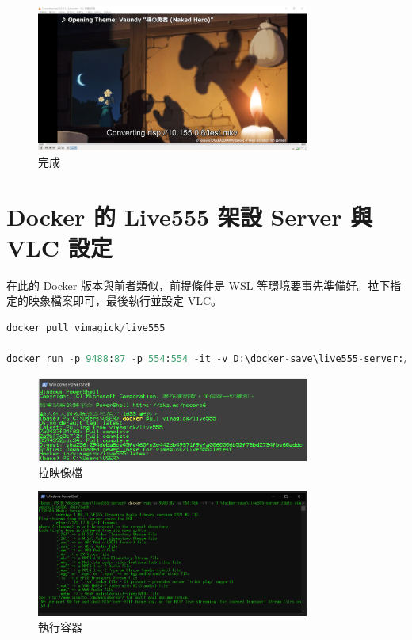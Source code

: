 \documentclass[10pt,UTF8]{ctexart}
\begin{document}
\begin{figure}[H]
\centering 
\includegraphics[width=0.80\textwidth]{13.png} 
\caption{完成}
\label{Test}
\end{figure}

\section{Docker 的 Live555 架設 Server 與 VLC 設定}

在此的 Docker 版本與前者類似，前提條件是 WSL 等環境要事先準備好。拉下指定的映象檔案即可，最後執行並設定 VLC。

\begin{lstlisting}[language={python}]
docker pull vimagick/live555

docker run -p 9488:87 -p 554:554 -it -v D:\docker-save\live555-server:/data vimagick/live555 /bin/bash

\end{lstlisting}

\begin{figure}[H]
\centering 
\includegraphics[width=0.80\textwidth]{14.png} 
\caption{拉映像檔}
\label{Test}
\end{figure}

\begin{figure}[H]
\centering 
\includegraphics[width=0.80\textwidth]{15.png} 
\caption{執行容器}
\label{Test}
\end{figure}
\end{document}
